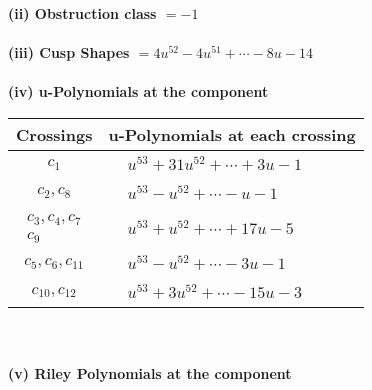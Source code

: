 \documentclass[1p]{elsarticle_modified}
\theoremstyle{definition}
\begin{document}
\flushleft \textbf{(ii) Obstruction class $= -1$}\\~\\
\flushleft \textbf{(iii) Cusp Shapes $= 4 u^{52}-4 u^{51}+\cdots-8 u-14$}\\~\\
\newpage\renewcommand{\arraystretch}{1}
\flushleft \textbf{(iv) u-Polynomials at the component}\newline \\
\begin{tabular}{m{50pt}|m{274pt}}
Crossings & \hspace{64pt}u-Polynomials at each crossing \\
\hline $$\begin{aligned}c_{1}\end{aligned}$$&$\begin{aligned}
&u^{53}+31 u^{52}+\cdots+3 u-1
\end{aligned}$\\
\hline $$\begin{aligned}c_{2},c_{8}\end{aligned}$$&$\begin{aligned}
&u^{53}- u^{52}+\cdots- u-1
\end{aligned}$\\
\hline $$\begin{aligned}c_{3},c_{4},c_{7}\\c_{9}\end{aligned}$$&$\begin{aligned}
&u^{53}+u^{52}+\cdots+17 u-5
\end{aligned}$\\
\hline $$\begin{aligned}c_{5},c_{6},c_{11}\end{aligned}$$&$\begin{aligned}
&u^{53}- u^{52}+\cdots-3 u-1
\end{aligned}$\\
\hline $$\begin{aligned}c_{10},c_{12}\end{aligned}$$&$\begin{aligned}
&u^{53}+3 u^{52}+\cdots-15 u-3
\end{aligned}$\\
\hline
\end{tabular}\\~\\
\newpage\renewcommand{\arraystretch}{1}
\flushleft \textbf{(v) Riley Polynomials at the component}\newline \\
\end{document}
